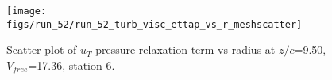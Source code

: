 \begin{figure}[H]
\centering
\texttt{[image: figs/run\_52/run\_52\_turb\_visc\_ettap\_vs\_r\_meshscatter]}
\caption{Scatter plot of $
u_T$ pressure relaxation term vs radius at $z/c$=9.50, $V_{free}$=17.36, station 6.}
\end{figure}



